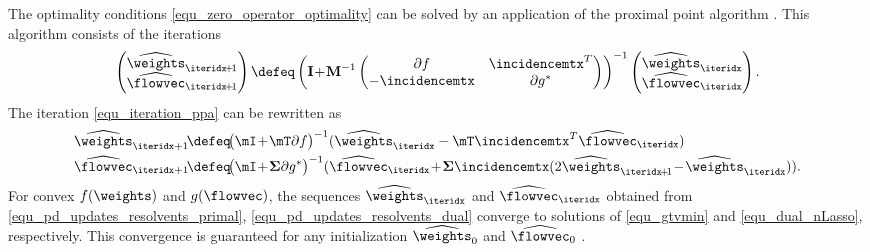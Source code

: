 \documentclass[lettersize,journal]{IEEEtran}
\begin{document}
The optimality conditions \eqref{equ_zero_operator_optimality} can be solved by an application of the 
proximal point algorithm \cite[Thm. 23.41]{BausckeCombette}. This algorithm consists of the iterations
\begin{equation} 
\label{equ_iteration_ppa}
\begin{pmatrix} \widehat{\weights}_{\iteridx\!+\!1} \\ \widehat{\flowvec}_{\iteridx\!+\!1} \end{pmatrix} \defeq \left( \mathbf{I}\!+\!\mathbf{M}^{-1}   \begin{pmatrix} \partial f &  \incidencemtx^{T}   \\  -\incidencemtx &  \partial  g^{*} \end{pmatrix} \right)^{-1} \begin{pmatrix} \widehat{\weights}_{\iteridx} \\ \widehat{\flowvec}_{\iteridx} \end{pmatrix}.
\end{equation}
The iteration \eqref{equ_iteration_ppa} can be rewritten as \cite{pock_chambolle_2016}
\begin{align}
\widehat{\weights}_{\iteridx+1} &\!\defeq\! \big( \mI \!+\! \mT \partial f \big)^{-1} (\widehat{\weights}_\iteridx - \mT \incidencemtx^T \widehat{\flowvec}_\iteridx) \label{equ_pd_updates_resolvents_primal} \\
\widehat{\flowvec}_{\iteridx+1} &\!\defeq\! \big( \mI \!+\! {\bf \Sigma} \partial g^* \big)^{-1} (\widehat{\flowvec}_\iteridx\!+\!{\bf \Sigma}  \incidencemtx ( 2\widehat{\weights}_{\iteridx\!+\!1}\!-\!\widehat{\weights}_{\iteridx})).   \label{equ_pd_updates_resolvents_dual}
\end{align}
For convex $f(\weights)$ and $g(\flowvec)$, the sequences $\widehat{\weights}_{\iteridx}$ 
and $\widehat{\flowvec}_{\iteridx}$ obtained from  \eqref{equ_pd_updates_resolvents_primal}, 
\eqref{equ_pd_updates_resolvents_dual} converge to solutions of \eqref{equ_gtvmin} and \eqref{equ_dual_nLasso}, 
respectively. This convergence is guaranteed for any initialization $\widehat{\weights}_{0}$ and $\widehat{\flowvec}_{0}$ \cite{PrecPockChambolle2011}.
\end{document}

